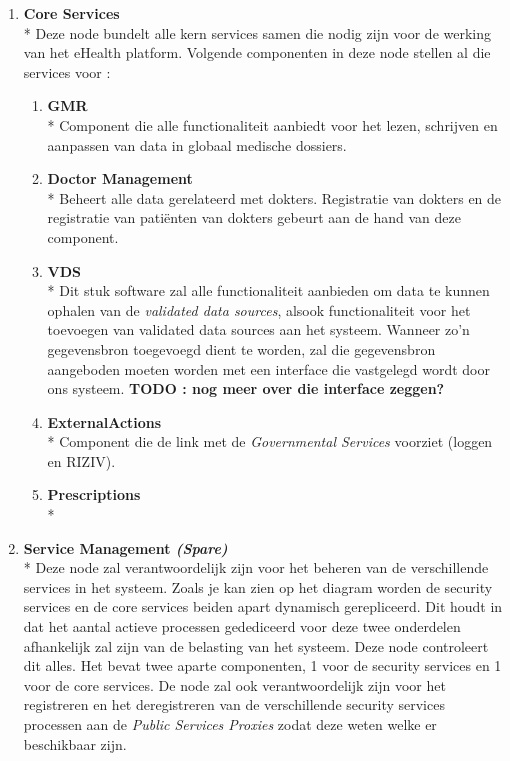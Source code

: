 \documentclass[a4paper,10pt]{article}
\begin{document}
\begin{enumerate}
\item \textbf{Core Services}\\*
Deze node bundelt alle kern services samen die nodig zijn voor de werking van het eHealth platform. Volgende componenten in deze node stellen al die services voor : 
\begin{enumerate}
 \item \textbf{GMR}\\*
Component die alle functionaliteit aanbiedt voor het lezen, schrijven en aanpassen van data in globaal medische dossiers.
\item \textbf{Doctor Management}\\*
Beheert alle data gerelateerd met dokters. Registratie van dokters en de registratie van patiënten van dokters gebeurt aan de hand van deze component.
\item \textbf{VDS}\\*
Dit stuk software zal alle functionaliteit aanbieden om data te kunnen ophalen van de \textit{validated data sources}, alsook functionaliteit voor het toevoegen van validated data sources aan het systeem. Wanneer zo'n gegevensbron toegevoegd dient te worden, zal die gegevensbron aangeboden moeten worden met een interface die vastgelegd wordt door ons systeem. \textbf{TODO : nog meer over die interface zeggen?}
\item \textbf{ExternalActions}\\*
Component die de link met de \textit{Governmental Services} voorziet (loggen en RIZIV).
\item \textbf{Prescriptions}\\*
\end{enumerate}
\item \textbf{Service Management \textit{(Spare)}}\\*
Deze node zal verantwoordelijk zijn voor het beheren van de verschillende services in het systeem. Zoals je kan zien op het diagram worden de security services en de core services beiden apart dynamisch gerepliceerd. Dit houdt in dat het aantal actieve processen gedediceerd voor deze twee onderdelen afhankelijk zal zijn van de belasting van het systeem. Deze node controleert dit alles. Het bevat twee aparte componenten, 1 voor de security services en 1 voor de core services. De node zal ook verantwoordelijk zijn voor het registreren en het deregistreren van de verschillende security services processen aan de \textit{Public Services Proxies} zodat deze weten welke er beschikbaar zijn.
\end{enumerate}
\end{document}
